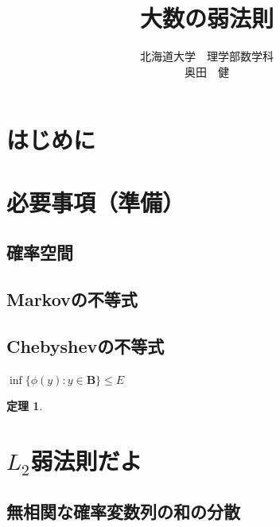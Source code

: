 \documentclass[dvipdfmx]{jsarticle}
\title{\bf 大数の弱法則}
\author{北海道大学　理学部数学科 \\ 奥田　健}
\date{}
\numberwithin{equation}{section}
\theoremstyle{definition}
\newtheorem{thm}{定理}[section]
\newcommand{\0}{\bm{0}}
\newcommand{\1}{\bm{1}}
\begin{document}
\maketitle{}

\newpage

\section{はじめに}

\section{必要事項（準備）}

\subsection{確率空間}

\subsection{Markovの不等式}


\subsection{Chebyshevの不等式}
$\inf\{\phi(y) : y \in \mathbf{B}\} \leq E$

\begin{thm}
   
\end{thm}

\section{\texorpdfstring{$L_2$}{L2}弱法則だよ}

\subsection{無相関な確率変数列の和の分散}
\end{document}
